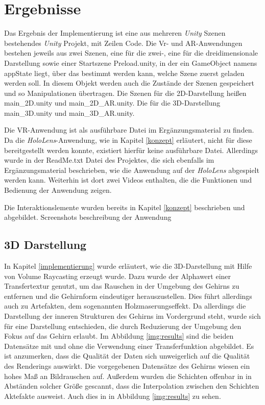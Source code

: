 

\chapter{Ergebnisse}
\label{ergebnisse}


Das Ergebnis der Implementierung ist eine aus mehreren \textit{Unity} Szenen bestehendes \textit{Unity} Projekt, mit  Zeilen Code. 
Die Vr- und AR-Anwendungen bestehen jeweils aus zwei Szenen, eine für die zwei-, eine für die dreidimensionale Darstellung sowie einer Startszene Preload.unity, in der ein GameObject namens appState liegt, über das bestimmt werden kann, welche Szene zuerst geladen werden soll. In diesem Objekt werden auch die Zustände der Szenen gespeichert und so Manipulationen übertragen.
Die Szenen für die 2D-Darstellung heißen main_2D.unity und main_2D_AR.unity. Die für die 3D-Darstellung main_3D.unity und main_3D_AR.unity.

Die VR-Anwendung ist als ausführbare Datei im Ergänzungsmaterial zu finden. Da die \textit{HoloLens}-Anwendung, wie in Kapitel \ref{konzept} erläutert, nicht für diese bereitgestellt werden konnte, existiert hierfür keine ausführbare Datei. Allerdings wurde in der ReadMe.txt Datei des Projektes, die sich ebenfalls im Ergänzungsmaterial beschrieben, wie die Anwendung auf der \textit{HoloLens} abgespielt werden kann. 
Weiterhin ist dort zwei Videos enthalten, die die Funktionen und Bedienung der Anwendung zeigen.

Die Interaktionslemente wurden bereits in Kapitel \ref{konzept} beschrieben und abgebildet. 
Screenshots
beschreibung der Anwendung

\section{3D Darstellung}

In Kapitel \ref{implementierung} wurde erläutert, wie die 3D-Darstellung mit Hilfe von Volume Raycasting erzeugt wurde. 
Dazu wurde der Alphawert einer Transfertextur genutzt, um das Rauschen in der Umgebung des Gehirns zu entfernen und die Gehirnform eindeutiger herauszustellen. Dies führt allerdings auch zu Artefakten, dem sogenannten Holzmaserungseffekt. Da allerdings die Darstellung der inneren Strukturen des Gehirns im Vordergrund steht, wurde sich für eine Darstellung entschieden, die durch Reduzierung der Umgebung den Fokus auf das Gehirn erlaubt. 
Im Abbildung \ref{img:results} sind die beiden Datensätze mit und ohne die Verwendung einer Transferfunktion abgebildet. 
Es ist anzumerken, dass die Qualität der Daten sich unweigerlich auf die Qualität des Renderings auswirkt. Die vorgegebenen Datensätze des Gehirns wiesen ein hohes Maß an Bildrauschen auf. Außerdem wurden die Schichten offenbar in in Abständen solcher Größe gescannt, dass die Interpolation zwischen den Schichten Aktefakte ausweist. Auch dies in in Abbildung \ref{img:results} zu sehen.

